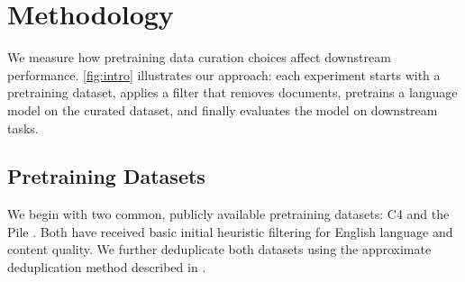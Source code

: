 \documentclass{article}
\begin{document}

\vspace{-3mm}
\section{Methodology}

We measure how pretraining data curation choices affect downstream performance. \cref{fig:intro} illustrates our approach: each experiment starts with a pretraining dataset, applies a filter that removes documents, pretrains a language model on the curated dataset, and finally evaluates the model on downstream tasks.



\vspace{-3mm}
\subsection{Pretraining Datasets}

We begin with two common, publicly available pretraining datasets: C4 \citep{raffel2020exploring} and the Pile \citep{gao2020pile}.
Both have received basic initial heuristic filtering for English language and content quality.
We further deduplicate both datasets using the approximate deduplication method described in \citet{lee2022deduplicating}.
\end{document}
